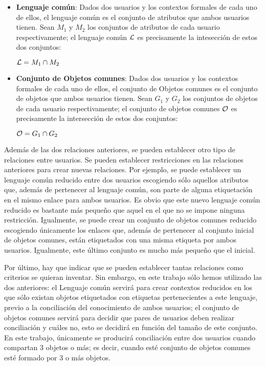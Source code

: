 \begin{itemize}
	\item {\bf Lenguaje común}: Dados dos usuarios y los contextos formales de cada uno de ellos, el lenguaje común es el conjunto de atributos que ambos usuarios tienen. Sean $M_1$ y  $M_2$ los conjuntos de atributos de cada usuario respectivamente; el lenguaje común $\cal{L}$ es precisamente la intesección de estos dos conjuntos:
\begin{center}
	${\cal L} = M_1 \cap M_2$
\end{center}

	\item {\bf Conjunto de Objetos comunes}: Dados dos usuarios y los contextos formales de cada uno de ellos, el conjunto de Objetos comunes es el conjunto de objetos que ambos usuarios tienen. Sean $G_1$ y $G_2$ los conjuntos de objetos de cada usuario respectivamente; el conjunto de objetos comunes ${\cal O}$ es precisamente la intersección de estos dos conjuntos:
\begin{center}
	${\cal O} = G_1 \cap G_2$
\end{center}
\end{itemize}

Además de las dos relaciones anteriores, se pueden establecer otro tipo de relaciones entre usuarios. Se pueden establecer restricciones en las relaciones anteriores para crear nuevas relaciones. Por ejemplo, se puede establecer un lenguaje común reducido entre dos usuarios escogiendo sólo aquellos atributos que, además de pertenecer al lenguaje común, son parte de alguna etiquetación en el mismo enlace para ambos usuarios. Es obvio que este nuevo lenguaje común reducido es bastante más pequeño que aquel en el que no se impone ninguna restricción. Igualmente, se puede crear un conjunto de objetos comunes reducido escogiendo únicamente los enlaces que, además de pertenecer al conjunto inicial de objetos comunes, están etiquetados con una misma etiqueta por ambos usuarios. Igualmente, este último conjunto es mucho más pequeño que el inicial.

Por último, hay que indicar que se pueden establecer tantas relaciones como criterios se quieran inventar. Sin embargo, en este trabajo sólo hemos utilizado las dos anteriores: el Lenguaje común servirá para crear contextos reducidos en los que sólo existan objetos etiquetados con etiquetas pertenecientes a este lenguaje, previo a la conciliación del conocimiento de ambos usuarios; el conjunto de objetos comunes servirá para decidir que pares de usuarios deben realizar conciliación y cuáles no, esto se decidirá en función del tamaño de este conjunto. En este trabajo, únicamente se producirá conciliación entre dos usuarios cuando compartan 3 objetos o más; es decir, cuando esté conjunto de objetos comunes esté formado por 3 o más objetos. 

